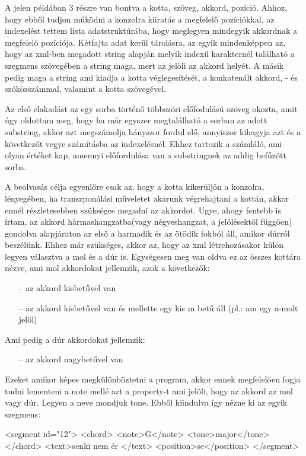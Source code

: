 A jelen példában 3 részre van bontva a kotta, szöveg, akkord, pozíció. Ahhoz, hogy ebből tudjon  működni a konzolra kiiratás a megfelelő pozíciókkal, az indexelést tettem lista adatstruktúrába, hogy meglegyen mindegyik akkordnak a megfelelő pozíciója. Kétfajta adat kerül tárolásra, az egyik mindenképpen az, hogy az xml-ben megadott string alapján melyik indexű karakternél található a szegmens szövegében a string maga, mert az jelöli az akkord helyét. A másik pedig maga a string ami kiadja a kotta véglegesítését, a konkatenált akkord, - és szóközszámmal, valamint a kotta szövegével.

Az első elakadást az egy sorba történő többszöri előfodulású szöveg okozta, amit úgy oldottam meg, hogy ha már egyszer megtalálható a sorban az adott substring, akkor azt megszámolja hányszor fordul elő, annyiszor kihagyja azt és a következőt vegye számításba az indexelésnél. Ehhez tartozik a számláló, ami olyan értéket kap, amennyi előfordulása van a substringnek az addig befűzött sorba.

A beolvasás célja egyenlőre csak az, hogy a kotta kikerüljön a konzolra, lényegében, ha transzponálási műveletet akarunk végrehajtani a kottán, akkor ennél részletesebben szükséges megadni az akkordot. Ugye, ahogy fentebb is írtam, az akkord hármashangzatba(vagy négyeshangzat, a jelölésektől függően) gondolva alapjáraton az első a harmadik és az ötödik fokból áll, amikor dúrról beszélünk. Ehhez már szükséges, akkor az, hogy az xml létrehozásakor külön legyen választva a mol és a dúr is. Egységesen meg van oldva ez az összes kottára nézve, ami mol akkordokat jellemzik, azok a következők:
\begin{itemize}
	\item[--]az akkord kisbetűvel van
	\item[--]az akkord kisbetűvel van és mellette egy kis m betű áll (pl.: am egy a-molt jelöl)\linebreak
\end{itemize}
Ami pedig a dúr akkordokat jellemzik:
\begin{itemize}
	\item[--]az akkord nagybetűvel van
\end{itemize}

Ezeket amikor képes megkülönböztetni a program, akkor ennek megfelelően fogja tudni lementeni a note mellé azt a property-t ami jelöli, hogy az akkord az mol vagy dúr. Legyen a neve mondjuk tone. Ebből kiindulva így nézne ki az egyik szegmens:
\begin{xml}
	<segment id="12">
	<chord>
	<note>G</note>
	<tone>major</tone>
	</chord>
	<text>senki nem ér </text>
	<position>se</position>
	</segment>
\end{xml}

